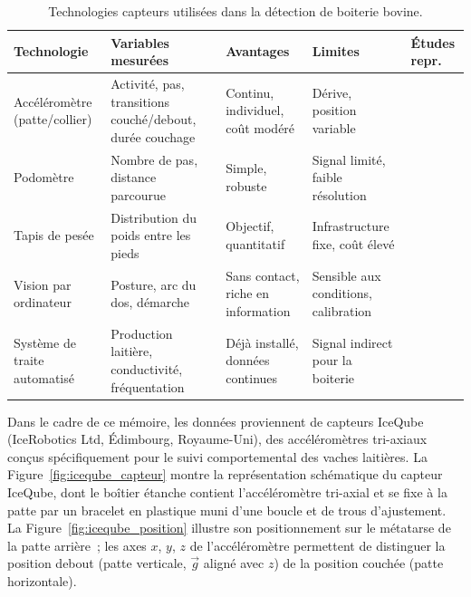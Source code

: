 \begin{table}[H]
    \centering
    \small
    \caption{Technologies capteurs utilisées dans la détection de boiterie bovine.}
    \label{tab:technologies_capteurs}
    \begin{tabular}{>{\raggedright\arraybackslash}p{2.4cm}
                    >{\raggedright\arraybackslash}p{2.8cm}
                    >{\raggedright\arraybackslash}p{2.8cm}
                    >{\raggedright\arraybackslash}p{2.2cm}
                    >{\raggedright\arraybackslash}p{2.2cm}}
        \toprule
        \textbf{Technologie} & \textbf{Variables mesurées} & \textbf{Avantages} &
        \textbf{Limites} & \textbf{Études repr.} \\
        \midrule
        Accéléromètre (patte/collier)
        & Activité, pas, transitions couché/debout, durée couchage
        & Continu, individuel, coût modéré
        & Dérive, position variable
        & \cite{alsaaod2012electronic,balasso2023behaviour} \\
        \addlinespace
        Podomètre
        & Nombre de pas, distance parcourue
        & Simple, robuste
        & Signal limité, faible résolution
        & \cite{flower2006effect,mazrier2006reliability} \\
        \addlinespace
        Tapis de pesée
        & Distribution du poids entre les pieds
        & Objectif, quantitatif
        & Infrastructure fixe, coût élevé
        & \cite{alsaaod2012electronic,hempel2019dairy} \\
        \addlinespace
        Vision par ordinateur
        & Posture, arc du dos, démarche
        & Sans contact, riche en information
        & Sensible aux conditions, calibration
        & \cite{qiao2021review} \\
        \addlinespace
        Système de traite automatisé
        & Production laitière, conductivité, fréquentation
        & Déjà installé, données continues
        & Signal indirect pour la boiterie
        & \cite{lavrova2023lameness,vanhertem2013lameness} \\
        \bottomrule
    \end{tabular}
\end{table}

Dans le cadre de ce mémoire, les données proviennent de capteurs IceQube
(IceRobotics Ltd, Édimbourg, Royaume-Uni), des accéléromètres tri-axiaux conçus
spécifiquement pour le suivi comportemental des vaches laitières. La
Figure~\ref{fig:iceqube_capteur} montre la représentation schématique du capteur IceQube,
dont le boîtier étanche contient l'accéléromètre tri-axial et se fixe à la patte par un
bracelet en plastique muni d'une boucle et de trous d'ajustement. La
Figure~\ref{fig:iceqube_position} illustre son positionnement sur le métatarse de la patte
arrière~; les axes $x$, $y$, $z$ de l'accéléromètre permettent de distinguer la position
debout (patte verticale, $\vec{g}$ aligné avec $z$) de la position couchée (patte
horizontale).

